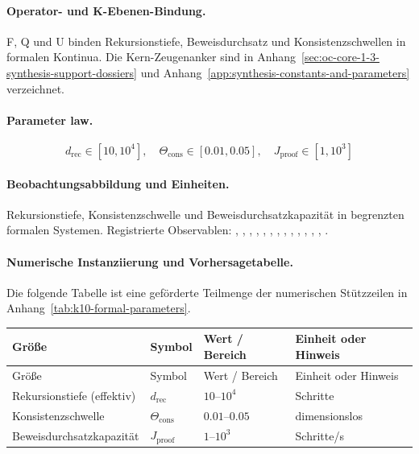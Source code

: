 \paragraph{Operator- und K-Ebenen-Bindung.}
F, Q und U binden Rekursionstiefe, Beweisdurchsatz und Konsistenzschwellen in formalen Kontinua.
Die Kern-Zeugenanker sind in Anhang~\ref{sec:oc-core-1-3-synthesis-support-dossiers} und Anhang~\ref{app:synthesis-constants-and-parameters} verzeichnet.

\paragraph{Parameter law.}
\[
d_{\mathrm{rec}} \in [10,10^4],\quad \Theta_{\mathrm{cons}} \in [0.01,0.05],\quad J_{\mathrm{proof}} \in [1,10^3]
\]

\paragraph{Beobachtungsabbildung und Einheiten.}
Rekursionstiefe, Konsistenzschwelle und Beweisdurchsatzkapazität in begrenzten formalen Systemen.
Registrierte Observablen: , \allowbreak {}, \allowbreak {}, \allowbreak {}, \allowbreak {}, \allowbreak {}, \allowbreak {}, \allowbreak {}, \allowbreak {}, \allowbreak {}, \allowbreak {}, \allowbreak {}, \allowbreak {}, \allowbreak {}.

\paragraph{Numerische Instanziierung und Vorhersagetabelle.}
Die folgende Tabelle ist eine geförderte Teilmenge der numerischen Stützzeilen in Anhang~\ref{tab:k10-formal-parameters}.
\begin{longtable}{@{}L{0.27\textwidth}L{0.15\textwidth}L{0.24\textwidth}L{0.16\textwidth}@{}}
\toprule
Größe & Symbol & Wert / Bereich & Einheit oder Hinweis \\
\midrule
\endfirsthead
\toprule
Größe & Symbol & Wert / Bereich & Einheit oder Hinweis \\
\midrule
\endhead
Rekursionstiefe (effektiv) & $\scriptstyle d_{\mathrm{rec}}$ & $10\text{--}10^4$ & Schritte \\
Konsistenzschwelle & $\scriptstyle \Theta_{\mathrm{cons}}$ & $0.01\text{--}0.05$ & dimensionslos \\
Beweisdurchsatzkapazität & $\scriptstyle J_{\mathrm{proof}}$ & $1\text{--}10^3$ & Schritte/s \\
\bottomrule
\end{longtable}


